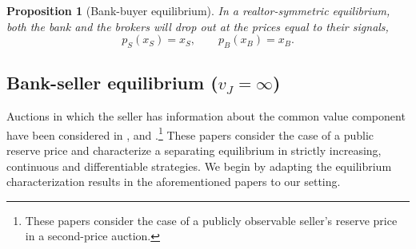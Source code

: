\documentclass[11pt,twopage]{article}
\newtheorem{proposition}{Proposition}
{\bf}{\it}
\begin{document}
\begin{proposition}[Bank-buyer equilibrium] 
In a realtor-symmetric equilibrium, both the bank and the brokers will drop out at the prices equal to their signals, \[ p_S(x_S) = x_S, \quad \quad p_B(x_B) = x_B. \]
\end{proposition}

\subsection{Bank-seller equilibrium ($v_J = \infty$)}

\label{sec:comm-value-comp}




%
%
% 
%
Auctions in which the seller has information about the common value
component have been considered in
\cite{jullien2006auction}, \cite{cai2007reserve} and \cite{lamy}.\footnote{These papers consider the case of a publicly observable seller's reserve price in a second-price auction.} 
These papers consider the case of a public reserve price and 
characterize a separating equilibrium in strictly increasing,
continuous and differentiable strategies.  
We begin by adapting the equilibrium characterization results in the aforementioned papers to our setting.
\end{document}
